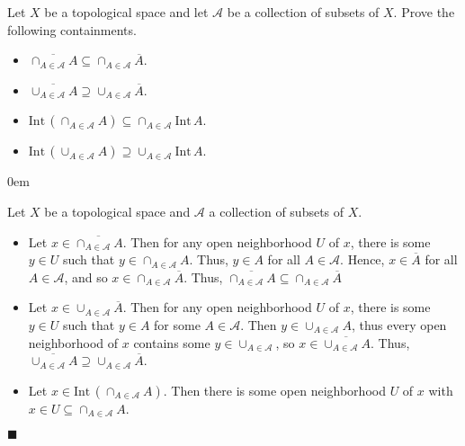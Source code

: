 \documentclass[12pt]{article}
\renewcommand{\qed}{\hfill$\blacksquare$}
\renewenvironment{proof}{\begin{addmargin}[1em]{0em}\begin{newproof}}{\end{newproof}\end{addmargin}\qed}
\newenvironment{problem}[2][Problem]{\begin{trivlist}
\item[\hskip \labelsep {\bfseries #1}\hskip \labelsep {\bfseries #2.}]}{\end{trivlist}}
\begin{document}
\begin{problem}{2.4}
	Let $X$ be a topological space and let $\mathcal{A}$ be a collection of subsets of $X$. Prove the following containments.
	\begin{itemize}
		\item $\overline{\cap_{A\in\mathcal{A}}A} \subseteq \cap_{A\in\mathcal{A}} \overline{A}$.
		\item $\overline{\cup_{A\in\mathcal{A}}A} \supseteq \cup_{A\in\mathcal{A}} \overline{A}$.
		\item $\text{Int}\, \left(\cap_{A\in\mathcal{A}}A\right) \subseteq \cap_{A\in\mathcal{A}}\text{Int}\,A$.
		\item $\text{Int}\, \left( \cup_{A\in\mathcal{A}}A \right) \supseteq \cup_{A\in\mathcal{A}} \text{Int}\, A$.
	\end{itemize}
\end{problem}
\begin{proof}
	Let $X$ be a topological space and $\mathcal{A}$ a collection of subsets of $X$.
	\begin{itemize}
		\item Let $x \in \overline{\cap_{A\in \mathcal{A}}A}$. Then for any open neighborhood $U$ of $x$, there is some $y \in U$ such that $y \in \cap_{A\in \mathcal{A}}A$. Thus, $y\in A$ for all $A \in \mathcal{A}$. Hence, $x\in \overline{A}$ for all $A\in \mathcal{A}$, and so $x\in \cap_{A\in \mathcal{A}}\overline{A}$. Thus, $\overline{\cap_{A\in \mathcal{A}}A} \subseteq \cap_{A\in \mathcal{A}}\overline{A}$

		\item Let $x\in \cup_{A\in\mathcal{A}}\overline{A}$. Then for any open neighborhood $U$ of $x$, there is some $y\in U$ such that $y \in A$ for some $A\in \mathcal{A}$. Then $y\in \cup_{A\in \mathcal{A}}A$, thus every open neighborhood of $x$ contains some $y \in \cup_{A\in \mathcal{A}}$, so $x\in \overline{\cup_{A\in \mathcal{A}}A}$. Thus, $\overline{\cup_{A\in \mathcal{A}}A} \supseteq \cup_{A\in\mathcal{A}}\overline{A}$.

		\item Let $x \in \text{Int}\, \left(\cap_{A\in \mathcal{A}}A\right)$. Then there is some open neighborhood $U$ of $x$ with $x \in U \subseteq \cap_{A\in \mathcal{A}}A$.

	\end{itemize}
\end{proof}
\end{document}
